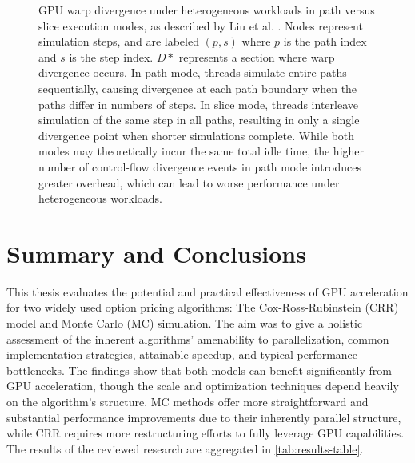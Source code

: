 \documentclass[english,12pt,a4paper,pdftex,sci,utf8]{aaltothesis}
\begin{document}
\begin{figure}[htbp]
\begin{tikzpicture}[
    node distance=0.9cm,
    every node/.style={minimum size=0.8cm, font=\footnotesize, thick, draw=black!70, inner sep=0pt}
]
\end{tikzpicture}
\caption{GPU warp divergence under heterogeneous workloads in path versus slice execution modes, as described by Liu et al. \cite{liu2010efficient}. Nodes represent simulation steps, and are labeled $(p,s)$ where $p$ is the path index and $s$ is the step index. $D*$ represents a section where warp divergence occurs. In path mode, threads simulate entire paths sequentially, causing divergence at each path boundary when the paths differ in numbers of steps. In slice mode, threads interleave simulation of the same step in all paths, resulting in only a single divergence point when shorter simulations complete. While both modes may theoretically incur the same total idle time, the higher number of control-flow divergence events in path mode introduces greater overhead, which can lead to worse performance under heterogeneous workloads. }

\label{fig:gpu-divergence}
\end{figure}

\section{Summary and Conclusions}  \label{sec:summary-conclusions}
This thesis evaluates the potential and practical effectiveness of GPU acceleration for two widely used option pricing algorithms: The Cox-Ross-Rubinstein (CRR) model and Monte Carlo (MC) simulation. The aim was to give a holistic assessment of the inherent algorithms' amenability to parallelization, common implementation strategies, attainable speedup, and typical performance bottlenecks. The findings show that both models can benefit significantly from GPU acceleration, though the scale and optimization techniques depend heavily on the algorithm's structure. MC methods offer more straightforward and substantial performance improvements due to their inherently parallel structure, while CRR requires more restructuring efforts to fully leverage GPU capabilities. The results of the reviewed research are aggregated in \cref{tab:results-table}.
\end{document}
